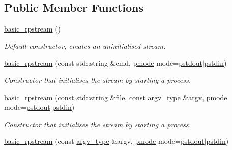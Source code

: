 \subsection*{Public Member Functions}
\begin{DoxyCompactItemize}
\item 
\mbox{\label{classredi_1_1basic__rpstream_a210a1597ec91b772d32cb3ca3880f47a}} 
\mbox{\hyperlink{classredi_1_1basic__rpstream_a210a1597ec91b772d32cb3ca3880f47a}{basic\+\_\+rpstream}} ()
\begin{DoxyCompactList}\small\item\em Default constructor, creates an uninitialised stream. \end{DoxyCompactList}\item 
\mbox{\hyperlink{classredi_1_1basic__rpstream_a23084bc3f621c35484ea33dce79f9c3e}{basic\+\_\+rpstream}} (const std\+::string \&cmd, \mbox{\hyperlink{structredi_1_1pstreams_a1eae4aad88812af03a0fbb3ec13c50b7}{pmode}} mode=\mbox{\hyperlink{structredi_1_1pstreams_ad3c6d53a98de4566478b1c40c101a42b}{pstdout}}$\vert$\mbox{\hyperlink{structredi_1_1pstreams_a7a976ce992db857f86a0cc3352e42d3a}{pstdin}})
\begin{DoxyCompactList}\small\item\em Constructor that initialises the stream by starting a process. \end{DoxyCompactList}\item 
\mbox{\hyperlink{classredi_1_1basic__rpstream_ae8bae1d56f8f7b8051d454d3ec7545f5}{basic\+\_\+rpstream}} (const std\+::string \&file, const \mbox{\hyperlink{structredi_1_1pstreams_af902b894b095c1875e96c10129489467}{argv\+\_\+type}} \&argv, \mbox{\hyperlink{structredi_1_1pstreams_a1eae4aad88812af03a0fbb3ec13c50b7}{pmode}} mode=\mbox{\hyperlink{structredi_1_1pstreams_ad3c6d53a98de4566478b1c40c101a42b}{pstdout}}$\vert$\mbox{\hyperlink{structredi_1_1pstreams_a7a976ce992db857f86a0cc3352e42d3a}{pstdin}})
\begin{DoxyCompactList}\small\item\em Constructor that initialises the stream by starting a process. \end{DoxyCompactList}\item 
\mbox{\hyperlink{classredi_1_1basic__rpstream_ab751fdb783fa58420ed25bd34a857da8}{basic\+\_\+rpstream}} (const \mbox{\hyperlink{structredi_1_1pstreams_af902b894b095c1875e96c10129489467}{argv\+\_\+type}} \&argv, \mbox{\hyperlink{structredi_1_1pstreams_a1eae4aad88812af03a0fbb3ec13c50b7}{pmode}} mode=\mbox{\hyperlink{structredi_1_1pstreams_ad3c6d53a98de4566478b1c40c101a42b}{pstdout}}$\vert$\mbox{\hyperlink{structredi_1_1pstreams_a7a976ce992db857f86a0cc3352e42d3a}{pstdin}})

\end{DoxyCompactItemize}
